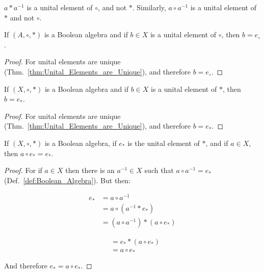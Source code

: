     $a*a^{\minus{1}}$ is a unital element of $\circ$, and not $*$. Similarly,
    $a\circ{a}^{\minus{1}}$ is a unital element of $*$ and not $\circ$.
    \begin{theorem}
        If $(A,\circ,*)$ is a Boolean algebra and if $b\in{X}$ is a
        unital element of $\circ$, then $b=e_{\circ}$.
    \end{theorem}
    \begin{proof}
        For unital elements are unique
        (Thm.~\ref{thm:Unital_Elements_are_Unique}), and therefore
        $b=e_{\circ}$.
    \end{proof}
    \begin{theorem}
        If $(X,\circ,*)$ is a Boolean algebra and if $b\in{X}$ is a
        unital element of $*$, then $b=e_{*}$.
    \end{theorem}
    \begin{proof}
        For unital elements are unique
        (Thm.~\ref{thm:Unital_Elements_are_Unique}), and therefore $b=e_{*}$.
    \end{proof}
    \begin{theorem}
        \label{thm:Bool_Alg_Boundary_of_Circ}%
        If $(X,\circ,*)$ is a Boolean algebra, if $e_{*}$ is the unital
        element of $*$, and if $a\in{X}$, then $a\circ{e}_{*}=e_{*}$.
    \end{theorem}
    \begin{proof}
        For if $a\in{X}$ then there is an $a^{\minus{1}}\in{X}$ such that
        $a\circ{a}^{\minus{1}}=e_{*}$ (Def.~\ref{def:Boolean_Algebra}).
        But then:
        \par\vspace{-2.5ex}
        \begin{minipage}[t]{0.51\textwidth}
            \centering
            \begin{align}
                e_{*}&=a\circ{a}^{\minus{1}}
                \tag{Complement}\\
                &=a\circ(a^{\minus{1}}*e_{*})
                \tag{Identity}\\
                &=(a\circ{a}^{\minus{1}})*(a\circ{e}_{*})
                \tag{Distributivity}
            \end{align}
        \end{minipage}
        \hfill
        \begin{minipage}[t]{0.47\textwidth}
            \centering
            \begin{align}
                &=e_{*}*(a\circ{e}_{*})
                \tag{Complement}\\
                &=a\circ{e}_{*}
                \tag{Identity}
            \end{align}
        \end{minipage}
        \par\vspace{2.5ex}
        And therefore $e_{*}=a\circ{e}_{*}$.
    \end{proof}
